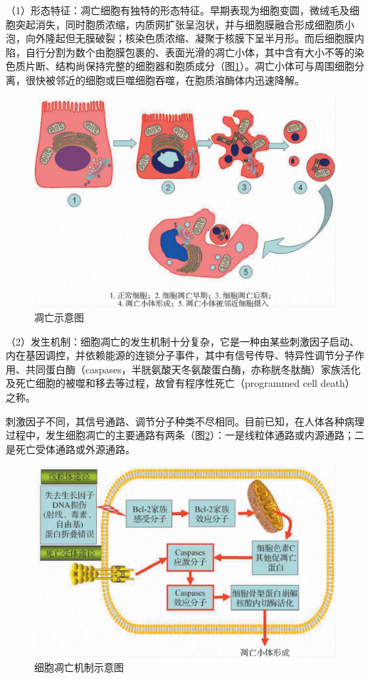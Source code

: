（1）形态特征：凋亡细胞有独特的形态特征。早期表现为细胞变圆，微绒毛及细胞突起消失，同时胞质浓缩，内质网扩张呈泡状，并与细胞膜融合形成细胞质小泡，向外隆起但无膜破裂；核染色质浓缩、凝聚于核膜下呈半月形。而后细胞膜内陷，自行分割为数个由胞膜包裹的、表面光滑的凋亡小体，其中含有大小不等的染色质片断、结构尚保持完整的细胞器和胞质成分（图\ref{fig1-18}）。凋亡小体可与周围细胞分离，很快被邻近的细胞或巨噬细胞吞噬，在胞质溶酶体内迅速降解。

\begin{figure}[!htbp]
	\centering
    \includegraphics[width=.7\textwidth]{./images/Image00019.jpg}
	\caption{凋亡示意图}
	\label{fig1-18} 
    \end{figure} 

（2）发生机制：细胞凋亡的发生机制十分复杂，它是一种由某些刺激因子启动、内在基因调控，并依赖能源的连锁分子事件，其中有信号传导、特异性调节分子作用、共同蛋白酶（caspases，半胱氨酸天冬氨酸蛋白酶，亦称胱冬肽酶）家族活化及死亡细胞的被噬和移去等过程，故曾有程序性死亡（programmed
cell death）之称。

刺激因子不同，其信号通路、调节分子种类不尽相同。目前已知，在人体各种病理过程中，发生细胞凋亡的主要通路有两条（图\ref{fig1-19}）：一是线粒体通路或内源通路；二是死亡受体通路或外源通路。

\begin{figure}[!htbp]
	\centering
    \includegraphics[width=.7\textwidth]{./images/Image00020.jpg}
	\caption{细胞凋亡机制示意图}
	\label{fig1-19} 
    \end{figure} 

